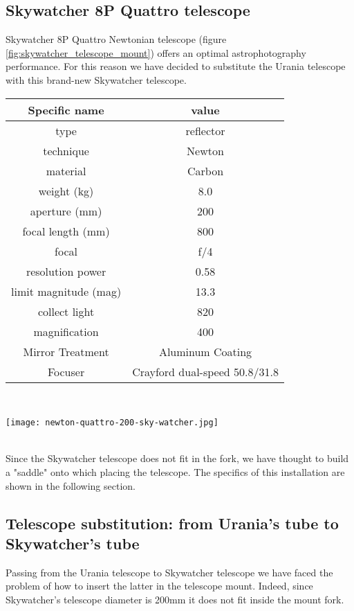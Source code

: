 \subsection{Skywatcher 8P Quattro telescope}
Skywatcher 8P Quattro Newtonian telescope (figure \ref{fig:skywatcher_telescope_mount}) offers an optimal astrophotography performance.
For this reason we have decided to substitute the Urania telescope with this brand-new Skywatcher telescope.
\\
\begin{minipage}{0.5\textwidth}
    \centering
    \begin{tabular}{c|c}
        Specific name & value \\
        \hline
        type & reflector \\
        technique & Newton  \\
        material & Carbon  \\
        weight (kg) & 8.0 \\
        aperture (mm) & 200 \\
        focal length (mm) & 800 \\
        focal & f/4 \\
        resolution power & 0.58 \\
        limit magnitude (mag) & 13.3 \\
        collect light & 820 \\
        magnification & 400 \\
        Mirror Treatment & Aluminum Coating \\
        Focuser & Crayford dual-speed 50.8/31.8 \\
        \hline
    \end{tabular}
    \label{tab_skywatcher_quattro}
\end{minipage}
\\
\begin{minipage}{0.5\textwidth}
    \centering
    \texttt{[image: newton-quattro-200-sky-watcher.jpg]}
    \label{fig:skywatcher_telescope_mount}
\end{minipage}
\\
Since the Skywatcher telescope does not fit in the fork, we have thought to build a "saddle" onto which placing the telescope.
The specifics of this installation are shown in the following section.

\subsection{Telescope substitution: from Urania's tube to Skywatcher's tube}
Passing from the Urania telescope to Skywatcher telescope we have faced the problem of how to insert the latter in the telescope mount.
Indeed, since Skywatcher's telescope diameter is 200mm it does not fit inside the mount fork.


